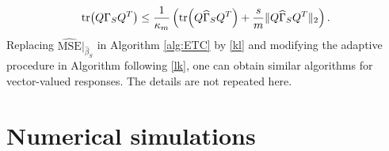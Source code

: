 \documentclass[11pt,a4paper]{amsart}
\numberwithin{equation}{section}
\theoremstyle{plain}
\theoremstyle{definition}
\def\E{{\mathbb E}}
\def\mse{{\text{MSE}}}
\begin{document}
\begin{align}
\tr(Q\Gamma_SQ^T)\leq \frac{1}{\kappa_m}\left(\tr(Q\widehat{\Gamma}_SQ^T)+\frac{s}{m}\|Q\widehat{\Gamma}_SQ^T\|_2\right).\label{lk}
\end{align} 
Replacing $\widehat{\mse}|_{\widehat{\beta}_S}$ in Algorithm \ref{alg:ETC} by \eqref{kl} and modifying the adaptive procedure in Algorithm following \eqref{lk}, one can obtain similar algorithms for vector-valued responses. The details are not repeated here. 
%


\section{Numerical simulations}
\end{document}
